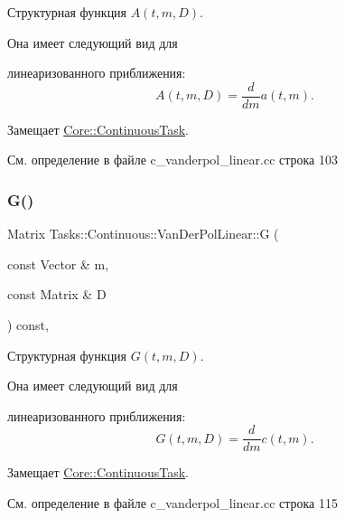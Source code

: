 Структурная функция $A(t, m, D)$. 

Она имеет следующий вид для


\begin{DoxyItemize}
\item линеаризованного приближения\+: \[A(t, m, D) = \frac{d}{dm} a(t, m).\] 
\end{DoxyItemize}

Замещает \hyperlink{class_core_1_1_continuous_task_a75fbac1abe67223cd7938b724c5cce45}{Core\+::\+Continuous\+Task}.



См. определение в файле c\+\_\+vanderpol\+\_\+linear.\+cc строка 103

\hypertarget{class_tasks_1_1_continuous_1_1_van_der_pol_linear_a931ba012a9671d8f522975232b48320f}{}\label{class_tasks_1_1_continuous_1_1_van_der_pol_linear_a931ba012a9671d8f522975232b48320f} 
\subsubsection{\texorpdfstring{G()}{G()}}
{\footnotesize\ttfamily Matrix Tasks\+::\+Continuous\+::\+Van\+Der\+Pol\+Linear\+::G (\begin{DoxyParamCaption}\item[{const Vector \&}]{m,  }\item[{const Matrix \&}]{D }\end{DoxyParamCaption}) const\hspace{0.3cm}{\ttfamily [override]}, {\ttfamily [virtual]}}



Структурная функция $G(t, m, D)$. 

Она имеет следующий вид для


\begin{DoxyItemize}
\item линеаризованного приближения\+: \[G(t, m, D) = \frac{d}{dm} c(t, m).\] 
\end{DoxyItemize}

Замещает \hyperlink{class_core_1_1_continuous_task_a1b579e183ffa229f97048aadfd834517}{Core\+::\+Continuous\+Task}.



См. определение в файле c\+\_\+vanderpol\+\_\+linear.\+cc строка 115

